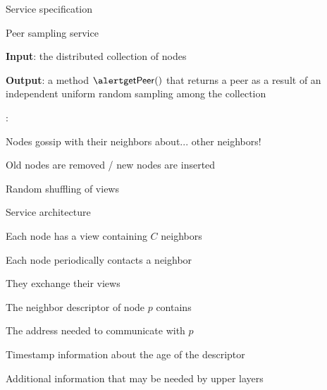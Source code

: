 \begin{frame}{Service specification}
	
\begin{block}{Peer sampling service}
\BI
\item \textbf{Input}: the distributed collection of nodes
\item \textbf{Output}: a method $\getPeer()$ that returns a peer as a
result of an independent uniform random sampling among the collection
\EI
\end{block}	
	
\bigskip
{}:\\
\BI
\item Nodes gossip with their neighbors about... other neighbors!
\item Old nodes are removed / new nodes are inserted
\item Random \alert{shuffling} of views
\EI
	
\end{frame}

\begin{frame}{Service architecture}

\BI
\item Each node has a view containing $C$ neighbors
\item Each node periodically contacts a neighbor 
\item They exchange their views
\EI

\bigskip
\begin{block}{The \alert{neighbor descriptor} of node $p$ contains}
\BI
\item The address needed to communicate with $p$
\item Timestamp information about the age of the descriptor
\item Additional information that may be needed by upper layers
\EI
\end{block}

\end{frame}

